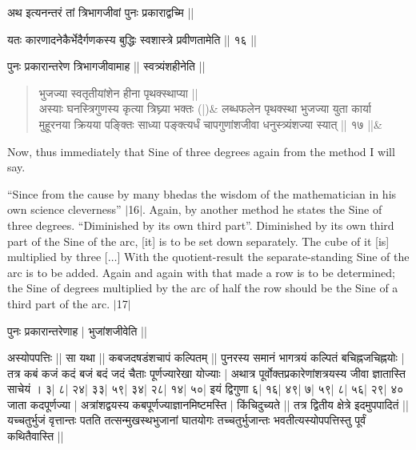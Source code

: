 \documentclass[12pt]{book}
\def\elp{$\ldots$}
\def\danda{$|$}
\begin{document}
\newpage


{\s अथ इत्यनन्तरं तां त्रिभागजीवां पुनः प्रकाराद्वच्मि ||}

\vskip15pt
{\s यतः कारणादनेकैर्भेदैर्गणकस्य बुद्धिः स्वशास्त्रे प्रवीणतामेति || १६ ||}

\vskip15pt
{\s पुनः प्रकारान्तरेण त्रिभागजीवामाह || स्वत्र्यंशहीनेति ||}

\vskip15pt

\begin{verse}
{\s भुजज्या स्वतृतीयांशेन हीना पृथक्स्थाप्या ||\\
अस्याः घनस्त्रिगुणस्य कृत्या त्रिघ्न्या भक्तः (|)}\&
{\s लब्धफलेन पृथक्स्था भुजज्या युता
कार्या \\
मुहूरनया क्रियया पङ्क्तिः साध्या
पङ्क्त्यर्धं चापगुणांशजीवा
धनुस्त्र्यंशज्या स्यात् || १७ ||}\&
\end{verse}
\newpage


Now, thus immediately that Sine of three degrees again from the method I will say.

``Since from the cause by many bhedas the wisdom of the mathematician in 
his own science cleverness'' \danda16\danda. Again, by another method he states the Sine
of three degrees.  ``Diminished by its own third part''. 
Diminished by its own third part of the Sine
of the arc, [it] is to be set down separately.  The cube of it [is] multiplied by three [\elp]
With the quotient-result the separate-standing Sine of the arc is to be added. Again
and again with that made a row is to be determined; the Sine of degrees multiplied
by the arc of half the row should be the Sine of a third part of the arc. \danda17\danda
\newpage 




\vskip15pt
{\s पुनः प्रकारान्तरेणाह | भुजांशजीवेति ||}

{\s अस्योपपत्तिः || सा यथा ||
कबजदषडंशचापं कल्पितम् ||
पुनरस्य समानं भागत्रयं कल्पितं बचिह्नजचिह्नयोः |
तत्र कबं कजं कदं बजं बदं जदं चैताः
पूर्णज्यारेखा योज्याः |
अथात्र पूर्वोक्तप्रकारेणांशत्रयस्य जीवा ज्ञातास्ति साचेयं । 
३| ८| २४| ३३| ५९| ३४| २८| १४| ५०| इयं द्विगुणा
६| १६| ४९| ७| ५९| ८| ५६| २९| ४० जाता कदपूर्णज्या |
अत्रांशद्वयस्य कबपूर्णज्याज्ञानमिष्टमस्ति |
किंचिदुच्यते ||
तत्र
द्वितीय क्षेत्रे इदमुपपादितं ||
यच्चतुर्भुजं वृत्तान्तः पतति तत्सन्मुखस्थभुजानां घातयोगः
तच्चतुर्भुजान्तः
भवतीत्यस्योपपत्तिस्तु पूर्वं कथितैवास्ति ||}
\end{document}
